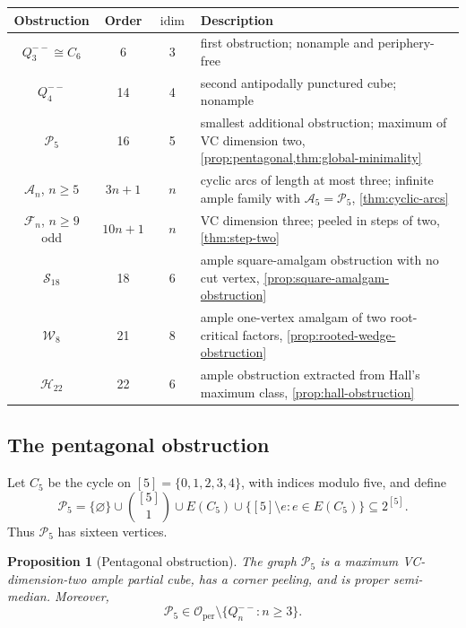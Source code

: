 \documentclass[11pt]{article}
\newtheorem{proposition}[theorem]{Proposition}
\theoremstyle{definition}
\theoremstyle{remark}
\newcommand{\Oper}{\mathcal O_{\mathrm{per}}}
\newcommand{\idim}{\operatorname{idim}}
\begin{document}
\begin{center}
\small
\begin{tabular}{@{}c c c p{}@{}}
\toprule
Obstruction & Order & \(\idim\) & Description \\
\midrule
\(Q_3^{--}\cong C_6\) & 6 & 3
  & first obstruction; nonample and periphery-free \\
\(Q_4^{--}\) & 14 & 4
  & second antipodally punctured cube; nonample \\
\(\mathcal P_5\) & 16 & 5
  & smallest additional obstruction; maximum of VC dimension two,
    \cref{prop:pentagonal,thm:global-minimality} \\
\(\mathcal A_n\), \(n\ge5\) & \(3n+1\) & \(n\)
  & cyclic arcs of length at most three; infinite ample family with
    \(\mathcal A_5=\mathcal P_5\), \cref{thm:cyclic-arcs} \\
\(\mathcal F_n\), \(n\ge9\) odd & \(10n+1\) & \(n\)
  & VC dimension three; peeled in steps of two,
    \cref{thm:step-two} \\
\(\mathcal S_{18}\) & 18 & 6
  & ample square-amalgam obstruction with no cut vertex,
    \cref{prop:square-amalgam-obstruction} \\
\(\mathcal W_8\) & 21 & 8
  & ample one-vertex amalgam of two root-critical factors,
    \cref{prop:rooted-wedge-obstruction} \\
\(\mathcal H_{22}\) & 22 & 6
  & ample obstruction extracted from Hall's maximum class,
    \cref{prop:hall-obstruction} \\
\bottomrule
\end{tabular}
\end{center}

\subsection{The pentagonal obstruction}

Let \(C_5\) be the cycle on \([5]=\{0,1,2,3,4\}\), with indices modulo five,
and define
\begin{equation}
 \mathcal P_5
  =\{\varnothing\}\cup\binom{[5]}1\cup E(C_5)
      \cup\{[5]\setminus e:e\in E(C_5)\}
  \subseteq2^{[5]}.
 \label{eq:pentagonal}
\end{equation}
Thus \(\mathcal P_5\) has sixteen vertices.

\begin{proposition}[Pentagonal obstruction]
\label{prop:pentagonal}
The graph \(\mathcal P_5\) is a maximum VC-dimension-two ample partial cube,
has a corner peeling, and is proper semi-median.  Moreover,
\[
 \mathcal P_5\in\Oper\setminus\{Q_n^{--}:n\ge3\}.
\]
\end{proposition}
\end{document}
